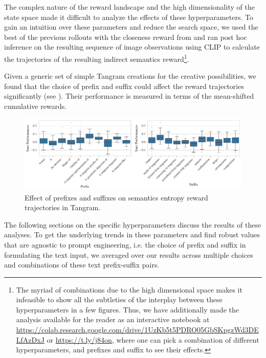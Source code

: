 The complex nature of the reward landscape and the high dimensionality of the state space made it difficult to analyze the effects of these hyperparameters.
To gain an intuition over these parameters and reduce the search space, we used the best of the previous rollouts with the closeness reward from  and ran post hoc inference on the resulting sequence of image observations using CLIP to calculate the trajectories of the resulting indirect semantics reward\footnote{The myriad of combinations due to the high dimensional space makes it infeasible to show all the subtleties of the interplay between these hyperparameters in a few figures.
Thus, we have additionally made the analysis available for the reader as an interactive notebook at \url{https://colab.research.google.com/drive/1UzKb5t5PDRO05GbSKpgzWd3DELfAzDxJ} or \url{https://t.ly/j84on}, where one can pick a combination of different hyperparameters, and prefixes and suffix to see their effects.}.

Given a generic set of simple Tangram creations for the creative possibilities, we found that the choice of prefix and suffix could affect the reward trajectories significantly (see ).
Their performance is measured in terms of the mean-shifted cumulative rewards.

\begin{figure}[h]
    \centering
    \includegraphics[width=\textwidth]{images/prefix-suffix.pdf}
    \caption{Effect of prefixes and suffixes on semantics entropy reward trajectories in Tangram.}
    \label{fig:prefix-suffix}
\end{figure}
\vspace{-7pt}
The following sections on the specific hyperparameters discuss the results of these analyses.
To get the underlying trends in these parameters and find robust values that are agnostic to prompt engineering, i.e. the choice of prefix and suffix in formulating the text input, we averaged over our results across multiple choices and combinations of these text prefix-suffix pairs.


